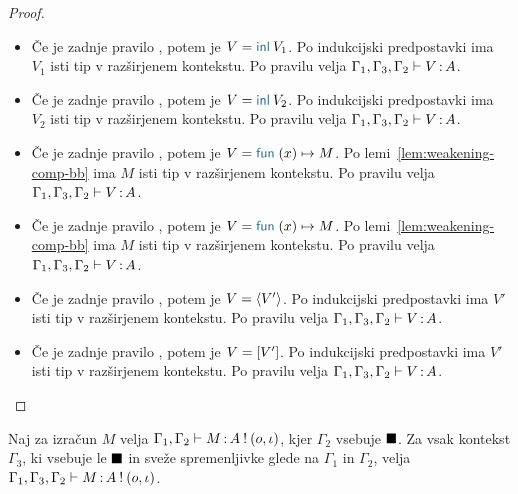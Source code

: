\begin{proof}
\begin{itemize}
		\item Če je zadnje pravilo , potem je $V = \tminl{V_1}$.
		Po indukcijski predpostavki ima $V_1$ isti tip v razširjenem kontekstu.
		Po pravilu  velja $\Gamma_1, \Gamma_3, \Gamma_2 \vdash V \mathinner{:} A$.
		
		\item Če je zadnje pravilo , potem je $V = \tminl{V_2}$.
		Po indukcijski predpostavki ima $V_2$ isti tip v razširjenem kontekstu.
		Po pravilu  velja $\Gamma_1, \Gamma_3, \Gamma_2 \vdash V \mathinner{:} A$.
		
		\item Če je zadnje pravilo , potem je $V = \tmfun{x}{M}$.
		Po lemi~\ref{lem:weakening-comp-bb} ima $M$ isti tip v razširjenem kontekstu.
		Po pravilu  velja $\Gamma_1, \Gamma_3, \Gamma_2 \vdash V \mathinner{:} A$.
		
		\item Če je zadnje pravilo , potem je $V = \tmfun{x}{M}$.
		Po lemi~\ref{lem:weakening-comp-bb} ima $M$ isti tip v razširjenem kontekstu.
		Po pravilu  velja $\Gamma_1, \Gamma_3, \Gamma_2 \vdash V \mathinner{:} A$.
		
		\item Če je zadnje pravilo , potem je $V =\langle V' \rangle$.
		Po indukcijski predpostavki ima $V'$ isti tip v razširjenem kontekstu.
		Po pravilu  velja $\Gamma_1, \Gamma_3, \Gamma_2 \vdash V \mathinner{:} A$.
		
		\item Če je zadnje pravilo , potem je $V = [V']$.
		Po indukcijski predpostavki ima $V'$ isti tip v razširjenem kontekstu.
		Po pravilu  velja $\Gamma_1, \Gamma_3, \Gamma_2 \vdash V \mathinner{:} A$.
	\end{itemize}
\end{proof}

\begin{lema}\label{lem:weakening-comp-bb}
	Naj za izračun $M$ velja $\Gamma_1, \Gamma_2 \vdash M \mathinner{:} A \mathbin{!} (o, \iota)$, kjer $\Gamma_2$ vsebuje $\blacksquare$.
	Za vsak kontekst $\Gamma_3$, ki vsebuje le $\blacksquare$ in sveže spremenljivke glede na $\Gamma_1$ in $\Gamma_2$, velja $\Gamma_1, \Gamma_3, \Gamma_2 \vdash M \mathinner{:} A \mathbin{!} (o, \iota)$.
\end{lema}

